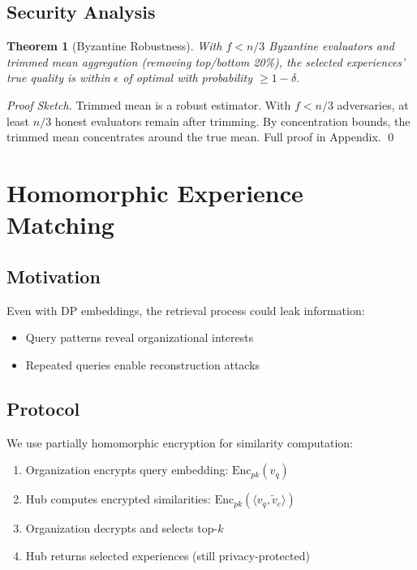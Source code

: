 \documentclass[11pt,letterpaper]{article}
\newtheorem{theorem}{Theorem}[section]
\begin{document}
\subsection{Security Analysis}

\begin{theorem}[Byzantine Robustness]
With $f < n/3$ Byzantine evaluators and trimmed mean aggregation (removing top/bottom 20\%), the selected experiences' true quality is within $\epsilon$ of optimal with probability $\geq 1 - \delta$.
\end{theorem}

\begin{proof}[Proof Sketch]
Trimmed mean is a robust estimator. With $f < n/3$ adversaries, at least $n/3$ honest evaluators remain after trimming. By concentration bounds, the trimmed mean concentrates around the true mean. Full proof in Appendix. \qed
\end{proof}

\section{Homomorphic Experience Matching}
\label{sec:homomorphic}

\subsection{Motivation}

Even with DP embeddings, the retrieval process could leak information:
\begin{itemize}
    \item Query patterns reveal organizational interests
    \item Repeated queries enable reconstruction attacks
\end{itemize}

\subsection{Protocol}

We use partially homomorphic encryption for similarity computation:

\begin{enumerate}
    \item Organization encrypts query embedding: $\text{Enc}_{pk}(v_q)$
    \item Hub computes encrypted similarities: $\text{Enc}_{pk}(\langle v_q, \tilde{v}_e \rangle)$
    \item Organization decrypts and selects top-$k$
    \item Hub returns selected experiences (still privacy-protected)
\end{enumerate}
\end{document}
